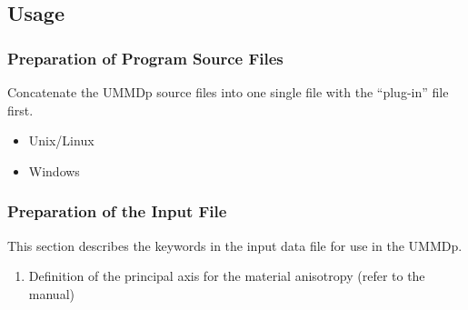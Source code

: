\documentclass[11pt,a4paper,twoside,final,onecolumn,titlepage]{article}
\begin{document}
\subsection{Usage}

\subsubsection{Preparation of Program Source Files}
Concatenate the UMMDp source files into one single file with the “plug-in” file first.
		\begin{itemize}
			\item Unix/Linux\\
			\par
			\texttt{}
		\end{itemize}
		\par\medskip
		\begin{itemize}
			\item Windows\\
			\par
			\texttt{}
		\end{itemize}
	
\subsubsection{Preparation of the Input File}
This section describes the keywords in the input data file for use in the UMMDp.

\begin{enumerate}
		\item Definition of the principal axis for the material anisotropy (refer to the manual)
		\par\bigskip	
		\texttt{}
		\par\bigskip
\end{enumerate}
\end{document}
